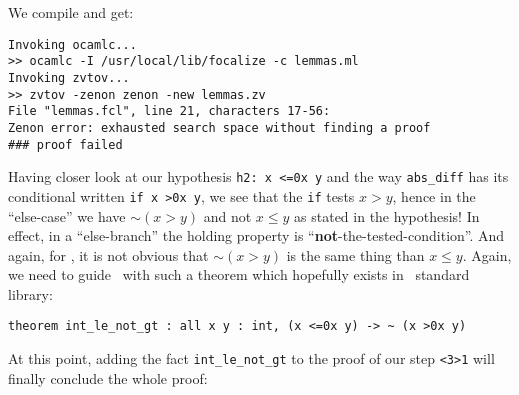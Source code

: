 \documentclass[11pt,a4paper,twoside,onecolumn,fullpage]{article}
\begin{document}
\noindent We compile and get:

{\scriptsize
\begin{verbatim}
Invoking ocamlc...
>> ocamlc -I /usr/local/lib/focalize -c lemmas.ml
Invoking zvtov...
>> zvtov -zenon zenon -new lemmas.zv
File "lemmas.fcl", line 21, characters 17-56:                
Zenon error: exhausted search space without finding a proof
### proof failed
\end{verbatim}}

Having closer look at our hypothesis \lstinline"h2: x <=0x y" and the
way \lstinline"abs_diff" has its conditional written
\lstinline"if x >0x y", we see that the \lstinline"if" tests $x >y$,
hence in the ``else-case'' we have $\sim (x >y)$ and not $x \le y$ as
stated in the hypothesis! In effect, in a ``else-branch'' the holding
property is ``{\bf not}-the-tested-condition''. And again, for \zenon,
it is not obvious that $\sim (x >y)$ is the same thing than $x \le y$.
Again, we need to guide \zenon\ with such a theorem which hopefully
exists in \focal\ standard library:

{\scriptsize
\begin{lstlisting}
theorem int_le_not_gt : all x y : int, (x <=0x y) -> ~ (x >0x y)
\end{lstlisting}}

At this point, adding the fact \lstinline"int_le_not_gt" to the proof
of our step \lstinline"<3>1" will finally conclude the whole proof:

{\scriptsize
}



\end{document}
